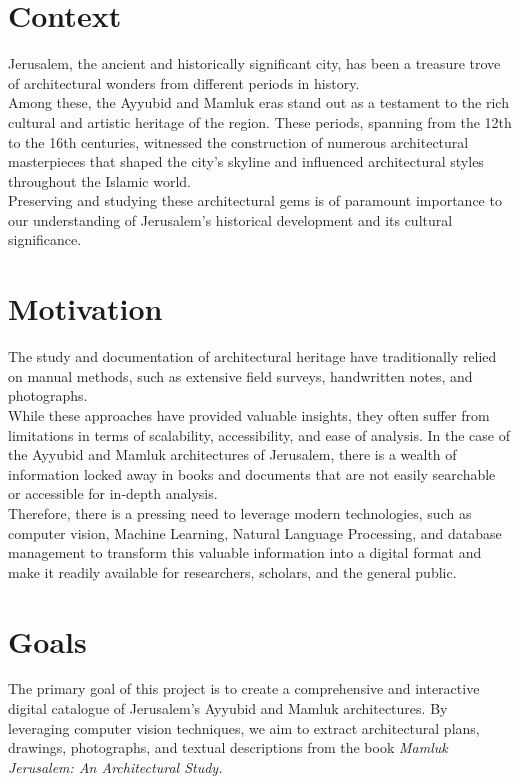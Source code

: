 \section{Context}

Jerusalem, the ancient and historically significant city, has been a treasure trove of architectural wonders from different periods in history. \\
Among these, the Ayyubid and Mamluk eras stand out as a testament to the rich cultural and artistic heritage of the region. These periods, spanning from the 12th to the 16th centuries, witnessed the construction of numerous architectural masterpieces that shaped the city's skyline and influenced architectural styles throughout the Islamic world. \\
Preserving and studying these architectural gems is of paramount importance to our understanding of Jerusalem's historical development and its cultural significance.

\section{Motivation}
The study and documentation of architectural heritage have traditionally relied on manual methods, such as extensive field surveys, handwritten notes, and photographs. \\
While these approaches have provided valuable insights, they often suffer from limitations in terms of scalability, accessibility, and ease of analysis. In the case of the Ayyubid and Mamluk architectures of Jerusalem, there is a wealth of information locked away in books and documents that are not easily searchable or accessible for in-depth analysis. \\
Therefore, there is a pressing need to leverage modern technologies, such as computer vision, Machine Learning, Natural Language Processing, and database management to transform this valuable information into a digital format and make it readily available for researchers, scholars, and the general public.


\section{Goals}
The primary goal of this project is to create a comprehensive and interactive digital catalogue of Jerusalem's Ayyubid and Mamluk architectures. By leveraging computer vision techniques, we aim to extract architectural plans, drawings, photographs, and textual descriptions from the book \textit{Mamluk Jerusalem: An Architectural Study.} \parencite{burgoyne1987mamluk}\\


